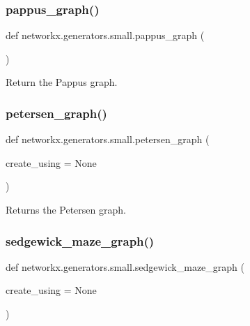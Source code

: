 \subsubsection{\texorpdfstring{pappus\+\_\+graph()}{pappus\_graph()}}
{\footnotesize\ttfamily def networkx.\+generators.\+small.\+pappus\+\_\+graph (\begin{DoxyParamCaption}{ }\end{DoxyParamCaption})}

\begin{DoxyVerb}Return the Pappus graph.\end{DoxyVerb}
 \mbox{\label{namespacenetworkx_1_1generators_1_1small_ac0e2149006478c7a1ca361fcf4d7c26c}} 
\subsubsection{\texorpdfstring{petersen\+\_\+graph()}{petersen\_graph()}}
{\footnotesize\ttfamily def networkx.\+generators.\+small.\+petersen\+\_\+graph (\begin{DoxyParamCaption}\item[{}]{create\+\_\+using = {\ttfamily None} }\end{DoxyParamCaption})}

\begin{DoxyVerb}Returns the Petersen graph.\end{DoxyVerb}
 \mbox{\label{namespacenetworkx_1_1generators_1_1small_a29d7fb36c94f9495208c28d6e4ec5eb2}} 
\subsubsection{\texorpdfstring{sedgewick\+\_\+maze\+\_\+graph()}{sedgewick\_maze\_graph()}}
{\footnotesize\ttfamily def networkx.\+generators.\+small.\+sedgewick\+\_\+maze\+\_\+graph (\begin{DoxyParamCaption}\item[{}]{create\+\_\+using = {\ttfamily None} }\end{DoxyParamCaption})}

